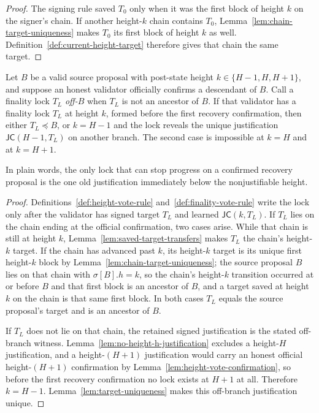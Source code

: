 \begin{proof}
The signing rule saved \(T_0\) only when it was the first block of height
\(k\) on the signer's chain.  If another height-\(k\) chain contains
\(T_0\), Lemma~\ref{lem:chain-target-uniqueness} makes \(T_0\) its first
block of height \(k\) as well.  Definition~\ref{def:current-height-target}
therefore gives that chain the same target.
\end{proof}

\begin{lemma}
\label{lem:lock-alignment}
Let \(B\) be a valid source proposal with post-state height
\(k\in\{H-1,H,H+1\}\), and suppose an honest validator officially
confirms a descendant of \(B\).  Call a finality lock \(T_L\)
\emph{off-\(B\)} when \(T_L\) is not an ancestor of \(B\).  If that
validator has a finality lock \(T_L\) at
height \(k\), formed before the first recovery confirmation, then either \(T_L\preceq B\), or \(k=H-1\) and the lock reveals
the unique justification \(\mathsf{JC}(H-1,T_L)\) on another branch.  The
second case is impossible at \(k=H\) and at \(k=H+1\).

In plain words, the only lock that can stop progress on a confirmed recovery
proposal is the one old justification immediately below the nonjustifiable
height.
\end{lemma}

\begin{proof}
Definitions~\ref{def:height-vote-rule} and~\ref{def:finality-vote-rule} write
the lock only after the validator has signed target \(T_L\) and learned
\(\mathsf{JC}(k,T_L)\).  If \(T_L\) lies on the chain ending at the official
confirmation, two cases arise.  While that chain is still at height
\(k\), Lemma~\ref{lem:saved-target-transfers} makes \(T_L\) the
chain's height-\(k\) target.  If the chain has advanced past \(k\), its
height-\(k\) target is its unique first height-\(k\) block by
Lemma~\ref{lem:chain-target-uniqueness}; the source proposal \(B\) lies
on that chain with \(\sigma[B].h=k\), so the chain's height-\(k\)
transition occurred at or before \(B\) and that first block is an
ancestor of \(B\), and a target saved at height \(k\) on the chain is
that same first block.  In both cases \(T_L\) equals the source
proposal's target
and is an ancestor of \(B\).

If \(T_L\) does not lie on that chain, the retained signed justification is
the stated off-branch witness.  Lemma~\ref{lem:no-height-h-justification} excludes a
height-\(H\) justification, and a height-\((H{+}1)\) justification would
carry an honest official height-\((H{+}1)\) confirmation by
Lemma~\ref{lem:height-vote-confirmation}, so before the first recovery
confirmation no lock exists at \(H+1\) at all.  Therefore \(k=H-1\).
Lemma~\ref{lem:target-uniqueness} makes this off-branch justification unique.
\end{proof}


